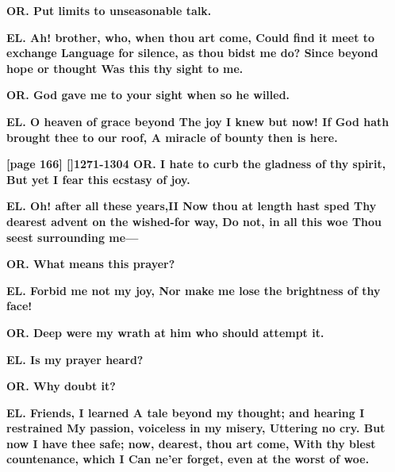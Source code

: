 \documentclass[11pt,letter]{book}
\begin{document}
\par \textbf{OR. Put limits to unseasonable talk.}
\par 

\par \textbf{EL. Ah! brother, who, when thou art come, Could find it meet to exchange Language for silence, as thou bidst me do? Since beyond hope or thought Was this thy sight to me.}
\par 

\par \textbf{OR. God gave me to your sight when so he willed.}
\par 

\par \textbf{EL. O heaven of grace beyond The joy I knew but now! If God hath brought thee to our roof, A miracle of bounty then is here.}
\par 

\par \textbf{[page 166] []1271-1304 OR. I hate to curb the gladness of thy spirit, But yet I fear this ecstasy of joy.}
\par 

\par \textbf{EL. Oh! after all these years,II Now thou at length hast sped Thy dearest advent on the wished-for way, Do not, in all this woe Thou seest surrounding me—}
\par 

\par \textbf{OR. What means this prayer?}
\par 

\par \textbf{EL. Forbid me not my joy, Nor make me lose the brightness of thy face!}
\par 

\par \textbf{OR. Deep were my wrath at him who should attempt it.}
\par 

\par \textbf{EL. Is my prayer heard?}
\par 

\par \textbf{OR. Why doubt it?}
\par 

\par \textbf{EL. Friends, I learned A tale beyond my thought; and hearing I restrained My passion, voiceless in my misery, Uttering no cry. But now I have thee safe; now, dearest, thou art come, With thy blest countenance, which I Can ne’er forget, even at the worst of woe.}
\par 
\end{document}
